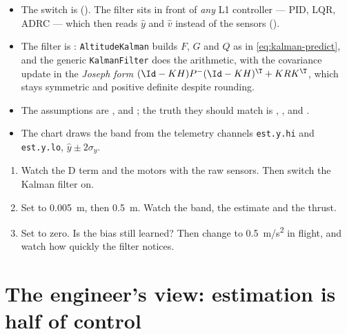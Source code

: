 \begin{inapp}
\begin{itemize}[leftmargin=1.2em]
  \item The switch is  (). The filter sits in front of \emph{any} L1 controller — PID, LQR, ADRC — which then reads $\hat y$ and $\hat v$ instead of the sensors ().
  \item The filter is : \texttt{AltitudeKalman} builds $F$, $G$ and $Q$ as in \cref{eq:kalman-predict}, and the generic \texttt{KalmanFilter} does the arithmetic, with the covariance update in the \emph{Joseph form} $(\Id - KH)P^-(\Id - KH)^\T + KRK^\T$, which stays symmetric and positive definite despite rounding.
  \item The assumptions are ,  and ; the truth they should match is , ,  and .
  \item The chart  draws the band from the telemetry channels \texttt{est.y.hi} and \texttt{est.y.lo}, $\hat y \pm 2\sigma_y$.
\end{itemize}
\end{inapp}

\begin{trythis}
\begin{enumerate}
  \item Watch the D term and the motors with the raw sensors. Then switch the Kalman filter on.
  \item Set  to \SI{0.005}{m}, then \SI{0.5}{m}. Watch the band, the estimate and the thrust.
  \item Set  to zero. Is the bias still learned? Then change  to \SI{0.5}{m/s^2} in flight, and watch how quickly the filter notices.
\end{enumerate}
\end{trythis}

\section{The engineer's view: estimation is half of control}

